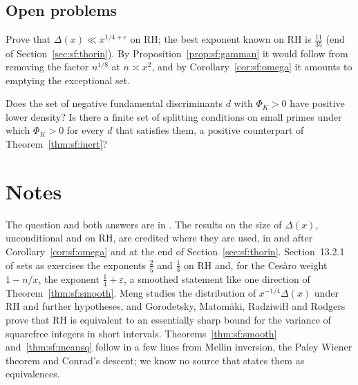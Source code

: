 \subsection{Open problems}

\begin{problem}\label{op:sfquarter}
Prove that $\Delta(x)\ll x^{1/4+\varepsilon}$ on RH; the best exponent known on RH is $\frac{11}{35}$ (end of Section~\ref{sec:sf:thorin}). By Proposition~\ref{prop:sf:gamman} it would follow from removing the factor $n^{1/8}$ at $n\asymp x^2$, and by Corollary~\ref{cor:sf:omega} it amounts to emptying the exceptional set.
\end{problem}

\begin{problem}\label{op:sfdensity}
Does the set of negative fundamental discriminants $d$ with $\Phi_K>0$ have positive lower density? Is there a finite set of splitting conditions on small primes under which $\Phi_K>0$ for every $d$ that satisfies them, a positive counterpart of Theorem~\ref{thm:sf:inert}?
\end{problem}

\section{Notes}

The question and both answers are in \cite{mathstackexchange2016}. The results on the size of $\Delta(x)$, unconditional and on RH, are credited where they are used, in and after Corollary~\ref{cor:sf:omega} and at the end of Section~\ref{sec:sf:thorin}. Section~13.2.1 of \cite{montgomeryvaughan2007} sets as exercises the exponents $\frac25$ and $\frac13$ on RH and, for the Ces\`aro weight $1-n/x$, the exponent $\frac14+\varepsilon$, a smoothed statement like one direction of Theorem~\ref{thm:sf:smooth}. Meng \cite{meng2017} studies the distribution of $x^{-1/4}\Delta(x)$ under RH and further hypotheses, and Gorodetsky, Matom\"aki, Radziwi\l\l{} and Rodgers \cite{gmrr2021} prove that RH is equivalent to an essentially sharp bound for the variance of squarefree integers in short intervals. Theorems~\ref{thm:sf:smooth} and~\ref{thm:sf:meansq} follow in a few lines from Mellin inversion, the Paley Wiener theorem and Conrad's descent; we know no source that states them as equivalences.

